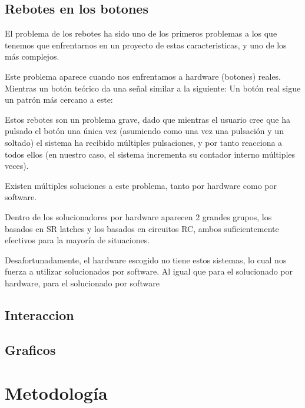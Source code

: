 \documentclass[12pt,letterpaper]{article}
\begin{document}
\subsection{Rebotes en los botones}
\label{subsec:rebound}
El problema de los rebotes ha sido uno de los primeros problemas a los
que tenemos que enfrentarnos en un proyecto de estas caracteristicas,
y uno de los más complejos.

Este problema aparece cuando nos enfrentamos a hardware (botones)
reales. Mientras un botón teórico da una señal similar a la siguiente:
Un botón real sigue un patrón más cercano a este:

Estos rebotes son un problema grave, dado que mientras el usuario cree
que ha pulsado el botón una única vez (asumiendo como una vez una
pulsación y un soltado) el sistema ha recibido múltiples pulsaciones,
y por tanto reacciona a todos ellos (en nuestro caso, el sistema
incrementa su contador interno múltiples veces).

Existen múltiples soluciones a este problema, tanto por hardware como
por software.

Dentro de los solucionadores por hardware aparecen 2 grandes grupos,
los basados en SR latches y los basados en circuitos RC, ambos
suficientemente efectivos para la mayoría de situaciones.

Desafortunadamente, el hardware escogido no tiene estos sistemas, lo
cual nos fuerza a utilizar solucionados por software. Al igual que
para el solucionado por hardware, para el solucionado por software



\subsection{Interaccion}
\label{subsec:interaction}

\subsection{Graficos}
\label{subsec:graphics}



\section{Metodología}
\end{document}
